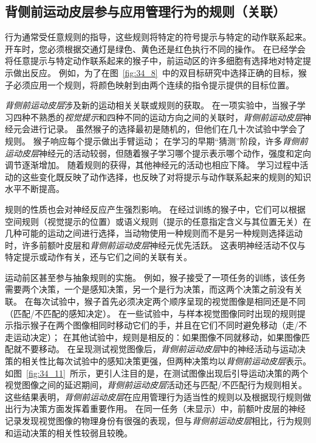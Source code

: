 \subsection{背侧前运动皮层参与应用管理行为的规则（关联）}

行为通常受任意规则的指导，这些规则将特定的符号提示与特定的动作联系起来。
开车时，您必须根据交通灯是绿色、黄色还是红色执行不同的操作。
在已经学会将任意提示与特定动作联系起来的猴子中，前运动区的许多细胞有选择地对特定提示做出反应。
例如，为了在图~\ref{fig:34_8}~中的双目标研究中选择正确的目标，猴子必须应用一个规则，将颜色映射到由两个连续的指令提示提供的目标位置。


\textit{背侧前运动皮层}涉及新的运动相关关联或规则的获取。
在一项实验中，当猴子学习四种不熟悉的\textit{视觉提示}和四种不同的运动方向之间的关联时，\textit{背侧前运动皮层}神经元会进行记录。
虽然猴子的选择最初是随机的，但他们在几十次试验中学会了规则。
猴子响应每个提示做出手臂运动；
在学习的早期“猜测”阶段，许多\textit{背侧前运动皮层}神经元的活动较弱，但随着猴子学习哪个提示表示哪个动作，强度和定向调节逐渐增加。
随着规则的获得，其他神经元的活动也相应下降。
学习过程中活动的这些变化既反映了动作选择，也反映了对将提示与动作联系起来的规则的知识水平不断提高。


规则的性质也会对神经反应产生强烈影响。
在经过训练的猴子中，它们可以根据空间规则（视觉提示的位置）或语义规则（提示的任意指定含义与其位置无关）在几种可能的运动之间进行选择，当动物使用一种规则而不是另一种规则选择运动时，许多前额叶皮层和\textit{背侧前运动皮层}神经元优先活跃。
这表明神经活动不仅与特定提示或动作有关，还与它们之间的关联有关。


运动前区甚至参与抽象规则的实施。
例如，猴子接受了一项任务的训练，该任务需要两个决策，一个是感知决策，另一个是行为决策，而这两个决策之前没有关联。
在每次试验中，猴子首先必须决定两个顺序呈现的视觉图像是相同还是不同（匹配/不匹配的感知决定）。
在一些试验中，与样本视觉图像同时出现的规则提示指示猴子在两个图像相同时移动它们的手，并且在它们不同时避免移动（走/不走运动决定）；
在其他试验中，规则是相反的：如果图像不同就移动，如果图像匹配就不要移动。
在呈现测试视觉图像后，\textit{背侧前运动皮层}中的神经活动与运动决策的相关性比每次试验中的感知决策更强，但两种决策均以\textit{背侧前运动皮层}表示。
如图~\ref{fig:34_11}~所示，更引人注目的是，在测试图像出现后引导运动决策的两个视觉图像之间的延迟期间，\textit{背侧前运动皮层}活动还与匹配/不匹配行为规则相关。
这些结果表明，\textit{背侧前运动皮层}在应用管理行为适当性的规则以及根据现行规则做出行为决策方面发挥着重要作用。
在同一任务（未显示）中，前额叶皮层的神经记录发现视觉图像的物理身份有很强的表现，但与\textit{背侧前运动皮层}相比，行为规则和运动决策的相关性较弱且较晚。


